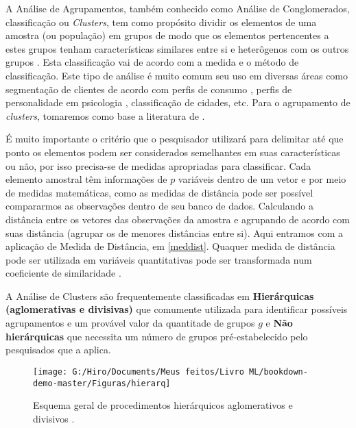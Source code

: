 \documentclass[
]{book}
\begin{document}
A Análise de Agrupamentos, também conhecido como Análise de Conglomerados, classificação ou \emph{Clusters}, tem como propósito dividir os elementos de uma amostra (ou população) em grupos de modo que os elementos pertencentes a estes grupos tenham características similares entre si e heterôgenos com os outros grupos \citep{mingoti2007analise}. Esta classificação vai de acordo com a medida e o método de classificação. Este tipo de análise é muito comum seu uso em diversas áreas como segmentação de clientes de acordo com perfis de consumo \citep{punj1983cluster}, perfis de personalidade em psicologia \citep{speece1985classification}, classificação de cidades, etc. Para o agrupamento de \emph{clusters}, tomaremos como base a literatura de \citet{mingoti2007analise}.

É muito importante o critério que o pesquisador utilizará para delimitar até que ponto os elementos podem ser considerados semelhantes em suas características ou não, por isso precisa-se de medidas apropriadas para classificar. Cada elemento amostral têm informações de \(p\) variáveis dentro de um vetor e por meio de medidas matemáticas, como as medidas de distância pode ser possível compararmos as observações dentro de seu banco de dados. Calculando a distância entre os vetores das observações da amostra e agrupando de acordo com suas distância (agrupar os de menores distâncias entre si). Aqui entramos com a aplicação de Medida de Distância, em \ref{meddist}. Quaquer medida de distância pode ser utilizada em variáveis quantitativas pode ser transformada num coeficiente de similaridade \citep{mingoti2007analise}.

A Análise de Clusters são frequentemente classificadas em \textbf{Hierárquicas (aglomerativas e divisivas)} que comumente utilizada para identificar possíveis agrupamentos e um provável valor da quantitade de grupos \(g\) e \textbf{Não hierárquicas} que necessita um número de grupos pré-estabelecido pelo pesquisados que a aplica.

\begin{figure}

{\centering \texttt{[image: G:/Hiro/Documents/Meus feitos/Livro ML/bookdown-demo-master/Figuras/hierarq]} 

}

\caption{Esquema geral de procedimentos hierárquicos aglomerativos e divisivos \citep{mingoti2007analise}.}\label{fig:hierarq}
\end{figure}
\end{document}
